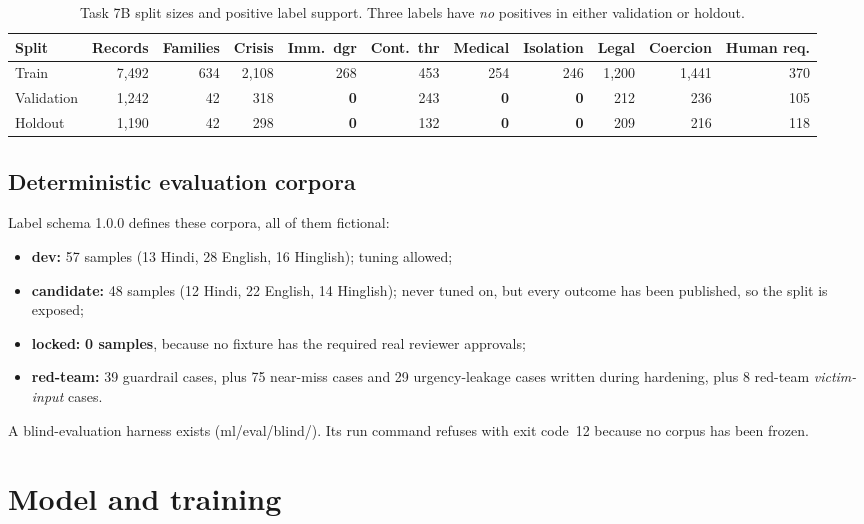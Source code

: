 \documentclass[11pt,a4paper]{article}
\newcommand{\codeus}{\textunderscore\allowbreak}
\DeclareRobustCommand{\code}[1]{{\ttfamily\let\_\codeus #1}}
\begin{document}
\begin{table}[!htbp]
\centering\footnotesize
\caption{Task 7B split sizes and positive label support. Three labels have \emph{no} positives in either validation or holdout.}
\label{tab:7bsupport}
\setlength{\tabcolsep}{3.8pt}
\begin{tabular}{@{}lrrrrrrrrrr@{}}
\toprule
Split & Records & Families & Crisis & Imm.\ dgr & Cont.\ thr & Medical & Isolation & Legal & Coercion & Human req. \\
\midrule
Train & 7{,}492 & 634 & 2{,}108 & 268 & 453 & 254 & 246 & 1{,}200 & 1{,}441 & 370 \\
Validation & 1{,}242 & 42 & 318 & \textbf{0} & 243 & \textbf{0} & \textbf{0} & 212 & 236 & 105 \\
Holdout & 1{,}190 & 42 & 298 & \textbf{0} & 132 & \textbf{0} & \textbf{0} & 209 & 216 & 118 \\
\bottomrule
\end{tabular}
\end{table}

\subsection{Deterministic evaluation corpora}
Label schema 1.0.0 defines these corpora, all of them fictional:
\begin{itemize}
  \item \textbf{dev:} 57 samples (13 Hindi, 28 English, 16 Hinglish); tuning allowed;
  \item \textbf{candidate:} 48 samples (12 Hindi, 22 English, 14 Hinglish); never tuned on, but
        every outcome has been published, so the split is exposed;
  \item \textbf{locked:} \textbf{0 samples}, because no fixture has the required real reviewer
        approvals;
  \item \textbf{red-team:} 39 guardrail cases, plus 75 near-miss cases and 29 urgency-leakage
        cases written during hardening, plus 8 red-team \emph{victim-input} cases.
\end{itemize}
A blind-evaluation harness exists (\code{ml/eval/blind/}). Its \code{run} command refuses with exit
code~12 because no corpus has been frozen.

\section{Model and training}
\label{sec:model}
\end{document}
